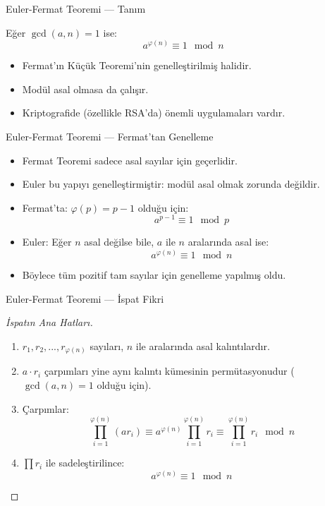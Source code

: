 \documentclass{beamer}
\begin{document}
\begin{frame}{Euler-Fermat Teoremi — Tanım}
  \begin{theorem}
    Eğer $\gcd(a, n) = 1$ ise:
    \[
      a^{\varphi(n)} \equiv 1 \mod n
    \]
  \end{theorem}
  
  \begin{itemize}
    \item Fermat'ın Küçük Teoremi'nin genelleştirilmiş halidir.
    \item Modül asal olmasa da çalışır.
    \item Kriptografide (özellikle RSA'da) önemli uygulamaları vardır.
  \end{itemize}
\end{frame}


\begin{frame}{Euler-Fermat Teoremi — Fermat’tan Genelleme}
  \begin{itemize}
    \item Fermat Teoremi sadece asal sayılar için geçerlidir.
    \item Euler bu yapıyı genelleştirmiştir: modül asal olmak zorunda değildir.
    \item Fermat’ta: $\varphi(p) = p - 1$ olduğu için:
    \[
      a^{p - 1} \equiv 1 \mod p
    \]
    \item Euler: Eğer $n$ asal değilse bile, $a$ ile $n$ aralarında asal ise:
    \[
      a^{\varphi(n)} \equiv 1 \mod n
    \]
    \item Böylece tüm pozitif tam sayılar için genelleme yapılmış oldu.
  \end{itemize}
\end{frame}

\begin{frame}{Euler-Fermat Teoremi — İspat Fikri}
  \begin{proof}[İspatın Ana Hatları]
    \begin{enumerate}
      \item $r_1, r_2, ..., r_{\varphi(n)}$ sayıları, $n$ ile aralarında asal kalıntılardır.
      \item $a \cdot r_i$ çarpımları yine aynı kalıntı kümesinin permütasyonudur ($\gcd(a,n)=1$ olduğu için).
      \item Çarpımlar:
      \[
        \prod_{i=1}^{\varphi(n)} (a r_i) \equiv a^{\varphi(n)} \prod_{i=1}^{\varphi(n)} r_i \equiv \prod_{i=1}^{\varphi(n)} r_i \mod n
      \]
      \item $\prod r_i$ ile sadeleştirilince:
      \[
        a^{\varphi(n)} \equiv 1 \mod n
      \]
    \end{enumerate}
  \end{proof}
\end{frame}
\end{document}
